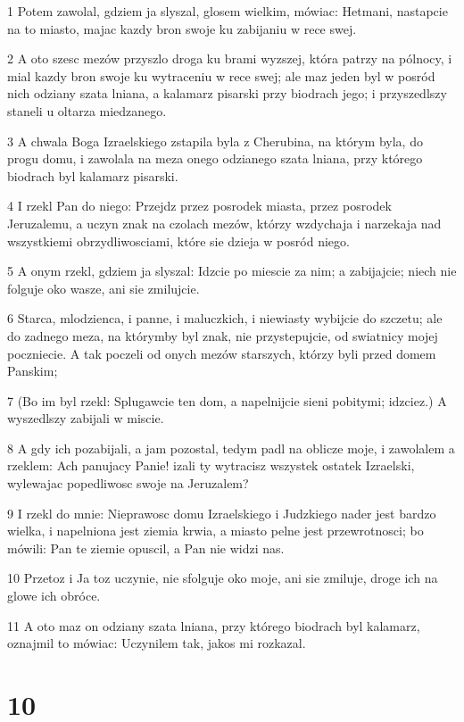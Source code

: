 \par 1 Potem zawolal, gdziem ja slyszal, glosem wielkim, mówiac: Hetmani, nastapcie na to miasto, majac kazdy bron swoje ku zabijaniu w rece swej.
\par 2 A oto szesc mezów przyszlo droga ku brami wyzszej, która patrzy na pólnocy, i mial kazdy bron swoje ku wytraceniu w rece swej; ale maz jeden byl w posród nich odziany szata lniana, a kalamarz pisarski przy biodrach jego; i przyszedlszy staneli u oltarza miedzanego.
\par 3 A chwala Boga Izraelskiego zstapila byla z Cherubina, na którym byla, do progu domu, i zawolala na meza onego odzianego szata lniana, przy którego biodrach byl kalamarz pisarski.
\par 4 I rzekl Pan do niego: Przejdz przez posrodek miasta, przez posrodek Jeruzalemu, a uczyn znak na czolach mezów, którzy wzdychaja i narzekaja nad wszystkiemi obrzydliwosciami, które sie dzieja w posród niego.
\par 5 A onym rzekl, gdziem ja slyszal: Idzcie po miescie za nim; a zabijajcie; niech nie folguje oko wasze, ani sie zmilujcie.
\par 6 Starca, mlodzienca, i panne, i maluczkich, i niewiasty wybijcie do szczetu; ale do zadnego meza, na którymby byl znak, nie przystepujcie, od swiatnicy mojej poczniecie. A tak poczeli od onych mezów starszych, którzy byli przed domem Panskim;
\par 7 (Bo im byl rzekl: Splugawcie ten dom, a napelnijcie sieni pobitymi; idzciez.) A wyszedlszy zabijali w miscie.
\par 8 A gdy ich pozabijali, a jam pozostal, tedym padl na oblicze moje, i zawolalem a rzeklem: Ach panujacy Panie! izali ty wytracisz wszystek ostatek Izraelski, wylewajac popedliwosc swoje na Jeruzalem?
\par 9 I rzekl do mnie: Nieprawosc domu Izraelskiego i Judzkiego nader jest bardzo wielka, i napelniona jest ziemia krwia, a miasto pelne jest przewrotnosci; bo mówili: Pan te ziemie opuscil, a Pan nie widzi nas.
\par 10 Przetoz i Ja toz uczynie, nie sfolguje oko moje, ani sie zmiluje, droge ich na glowe ich obróce.
\par 11 A oto maz on odziany szata lniana, przy którego biodrach byl kalamarz, oznajmil to mówiac: Uczynilem tak, jakos mi rozkazal.

\chapter{10}

